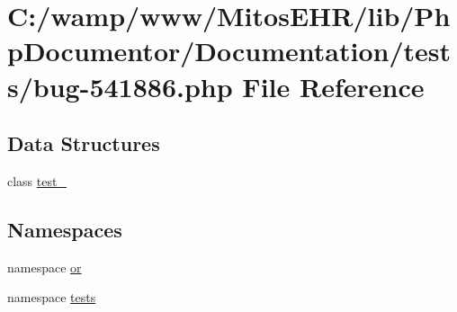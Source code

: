 \hypertarget{bug-541886_8php}{\section{\-C\-:/wamp/www/\-Mitos\-E\-H\-R/lib/\-Php\-Documentor/\-Documentation/tests/bug-\/541886.php \-File \-Reference}
\label{bug-541886_8php}
}
\subsection*{\-Data \-Structures}
\begin{DoxyCompactItemize}
\item 
class \hyperlink{classtest__541886}{test\-\_}
\end{DoxyCompactItemize}
\subsection*{\-Namespaces}
\begin{DoxyCompactItemize}
\item 
namespace \hyperlink{namespaceor}{or}
\item 
namespace \hyperlink{namespacetests}{tests}
\end{DoxyCompactItemize}
